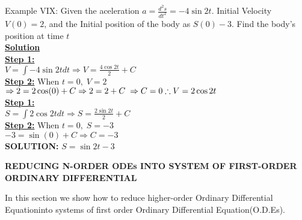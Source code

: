 \documentclass[a4paper 11pt]{article}
\newcommand{\bt}[1]{\textbf{#1}}
\newcommand{\NI}{\noindent}
\newcommand{\dsp}{\displaystyle}
\newcommand{\be}{\(\dsp} %
\newcommand{\ee}{\)\\[0.3cm]} %
\newcommand{\sol}{\bt{\NI\underline{Solution}}\\[0.2cm]}
\newcommand{\st}{\bt{\underline{Step 1:}}\\[0.2cm]}
\newcommand{\stn}[1]{\bt{\underline{Step 2:}} When \be#1\ee}
\newcommand{\imp}{\Rightarrow}
\renewcommand{\sp}{\\[0.3cm]}
\newcommand{\soL}[1]{\bt{SOLUTION:} \be #1 \ee}
\newcommand{\ODE}{Ordinary Differential Equation}
\begin{document}
\NI Example VIX: Given the aceleration \(a = \frac{d^{2}s}{dt^2} = -4 \sin 2t\). Initial Velocity \(V(0)=2\), and the Initial position of the body as \(S(0)-3\). Find the body's position at time \(t\)\\
\sol
\st
\be V = \int -4\sin 2t dt \imp V = \frac{4\cos 2t}{2} + C\ee
\stn{t=0, \; V=2}
\be
\imp 2 = 2 \cos(0) + C \imp 2 = 2 + C \; \imp C = 0 \sp
\therefore V = 2 \cos 2t
\ee
\st
\be
S = \int 2\cos 2t dt \imp S = \frac{2\sin 2t}{2} + C
\ee
\stn{t=0, \; S=-3}
\be
-3 = \sin(0) + C \imp C = -3
\ee
\soL{S=\sin 2t - 3}
\newpage
\begin{center}
\bt{REDUCING N-ORDER ODEs INTO SYSTEM OF FIRST-ORDER ORDINARY DIFFERENTIAL}
\end{center}
In this section we show how to reduce higher-order \ODE into systems of first order \ODE (O.D.Es).\\
\end{document}
